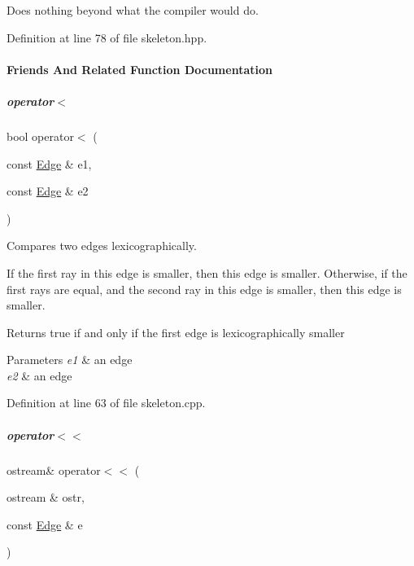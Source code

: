 Does nothing beyond what the compiler would do. 

Definition at line 78 of file skeleton.\+hpp.



\paragraph{Friends And Related Function Documentation}
\mbox{\label{group___c_l_s_solvers_aab1d947f208d0ba281c45ec9717522d6}} 
\subparagraph{\texorpdfstring{operator$<$}{operator<}}
{\footnotesize\ttfamily bool operator$<$ (\begin{DoxyParamCaption}\item[{const \hyperlink{group___c_l_s_solvers_class_l_p___solvers_1_1_edge}{Edge} \&}]{e1,  }\item[{const \hyperlink{group___c_l_s_solvers_class_l_p___solvers_1_1_edge}{Edge} \&}]{e2 }\end{DoxyParamCaption})\hspace{0.3cm}{\ttfamily [friend]}}



Compares two edges lexicographically. 

If the first ray in {\ttfamily this} edge is smaller, then {\ttfamily this} edge is smaller. Otherwise, if the first rays are equal, and the second ray in {\ttfamily this} edge is smaller, then {\ttfamily this} edge is smaller.

\begin{DoxyReturn}{Returns}
{\ttfamily true} if and only if the first edge is lexicographically smaller
\end{DoxyReturn}

\begin{DoxyParams}{Parameters}
{\em e1} & an edge \\
\hline
{\em e2} & an edge \\
\hline
\end{DoxyParams}


Definition at line 63 of file skeleton.\+cpp.

\mbox{\label{group___c_l_s_solvers_a21cc787db181be486f871e88cfc2ef54}} 
\subparagraph{\texorpdfstring{operator$<$$<$}{operator<<}}
{\footnotesize\ttfamily ostream\& operator$<$$<$ (\begin{DoxyParamCaption}\item[{ostream \&}]{ostr,  }\item[{const \hyperlink{group___c_l_s_solvers_class_l_p___solvers_1_1_edge}{Edge} \&}]{e }\end{DoxyParamCaption})\hspace{0.3cm}{\ttfamily [friend]}}



